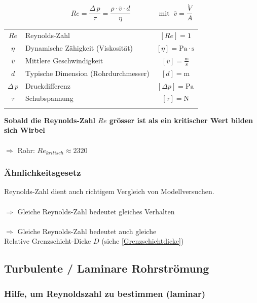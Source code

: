 $$\boxed{  Re = \frac{\Delta \, p}{\tau} = \frac{\rho \cdot \overline{v} \cdot d}{\eta} \qquad \qquad \mathrm{mit} \; \; \overline{v} = \frac{\dot{V}}{A} }  $$

	
\begin{tabular}{c l c}
		$Re$ & Reynolds-Zahl & $[Re] = 1$ \\
		$\eta$ & Dynamische Zähigkeit (Viskosität) & $[\eta] = \mathrm{Pa \cdot s}$  \\
		$\overline{v}$ & Mittlere Geschwindigkeit & $[\overline{v}] = \mathrm{\frac{m}{s}}$ \\
		$d$ & Typische Dimension (Rohrdurchmesser) & $[d] = \mathrm{m}$ \\
		$\Delta \, p$ & Druckdifferenz & $[\Delta p] = \mathrm{Pa}$ \\
		$\tau$ & Schubspannung & $[\tau] = \mathrm{N}$ \\
		\\
\end{tabular}

\textbf{Sobald die Reynolds-Zahl $Re$ grösser ist als ein kritischer Wert bilden sich Wirbel} \\
\\
$\Rightarrow$ Rohr:  $Re_{kritisch} \approx 2320$


\subsubsection{Ähnlichkeitsgesetz}
Reynolds-Zahl dient auch richtigem Vergleich von Modellversuchen. \\
\\
$\Rightarrow$ Gleiche Reynolds-Zahl bedeutet gleiches Verhalten \\
\\
$\Rightarrow$ Gleiche Reynolds-Zahl bedeutet auch gleiche \\
 Relative Grenzschicht-Dicke $D$ (siehe \ref{Grenzschichtdicke})



\vfill\null
\columnbreak


\subsection{Turbulente / Laminare Rohrströmung}

\subsubsection{Hilfe, um Reynoldszahl zu bestimmen (laminar)}

